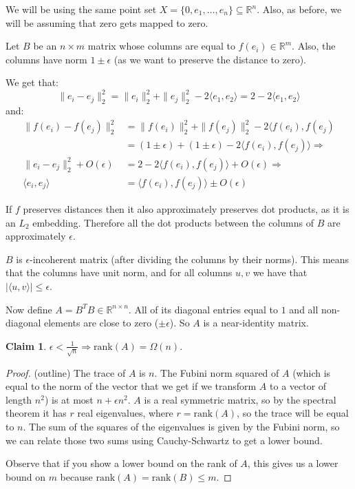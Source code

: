 \documentclass[11pt]{article}
\newcommand{\R}{\mathbb{R}}
\newcommand{\rank}{\text{rank}}
\newtheorem{claim}[theorem]{Claim}
\begin{document}
We will be using the same point set $X=\{0, e_1, \ldots, e_n\} \subseteq \R^n$. Also, as before, we will be assuming that zero gets mapped to zero.

Let $B$ be an $n\times m$ matrix whose columns are equal to $f(e_i)\in \R^m$. Also, the columns have norm $1\pm \epsilon$ (as we want to preserve the distance to zero).

We get that:
$$\|e_i-e_j\|_2^2=\|e_i\|_2^2+\|e_j\|_2^2-2\langle e_1, e_2 \rangle = 2-2\langle e_1, e_2 \rangle$$
and:
\begin{align*}\|f(e_i)-f(e_j)\|_2^2 &= \|f(e_i)\|_2^2 + \|f(e_j)\|_2^2 -2\langle f(e_i), f(e_j)\\
  &= (1\pm \epsilon) + (1\pm \epsilon) -2\langle f(e_i), f(e_j) \rangle \Rightarrow \\
  \|e_i-e_j\|_2^2 + O(\epsilon) & =2-2\langle f(e_i), f(e_j)\rangle + O(\epsilon) \Rightarrow\\
  \langle e_i, e_j\rangle & = \langle f(e_i), f(e_j) \rangle \pm O(\epsilon)
\end{align*}

If $f$ preserves distances then it also approximately preserves dot products, as it is an $L_2$ embedding. Therefore all the dot products between the columns of $B$ are approximately $\epsilon$.

$B$ is $\epsilon$-incoherent matrix (after dividing the columns by their norms). This means that the columns have unit norm, and for all columns $u, v$ we have that $|\langle u,v\rangle|\leq \epsilon$.

Now define $A=B^TB \in \R^{n\times n}$. All of its diagonal entries equal to $1$ and all non-diagonal elements are close to zero ($\pm \epsilon$). So $A$ is a near-identity matrix.

\begin{claim}
  $\epsilon<\frac{1}{\sqrt{n}} \Rightarrow \rank(A)=\Omega(n)$.
\end{claim}
\begin{proof} (outline) The trace of $A$ is $n$. The Fubini norm squared of $A$ (which is equal to the norm of the vector that we get if we transform $A$ to a vector of length $n^2$) is at most $n+\epsilon n^2$. $A$ is a real symmetric matrix, so by the spectral theorem it has $r$ real eigenvalues, where $r=\rank(A)$, so the trace will be equal to $n$.  The sum of the squares of the eigenvalues is given by the Fubini norm, so we can relate those two sums using Cauchy-Schwartz to get a lower bound.

  Observe that if you show a lower bound on the rank of $A$, this gives us a lower bound on $m$ because $\rank(A)=\rank(B) \leq m$.
\end{proof}
\end{document}
